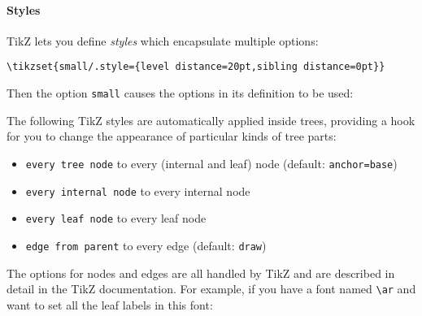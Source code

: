\documentclass{article}
\begin{document}
\paragraph{Styles} TikZ lets you define \emph{styles}\/ which encapsulate multiple options:
\begin{Verbatim}
\tikzset{small/.style={level distance=20pt,sibling distance=0pt}}
\end{Verbatim}
Then the option \verb|small| causes the options in its definition to be used:
\begin{center}
\begin{SideBySideExample}
%
\end{SideBySideExample}
\end{center}
The following TikZ styles are automatically applied inside trees,
providing a hook for you to change the appearance of particular kinds
of tree parts:
\begin{itemize}
\item \verb|every tree node| to every (internal and leaf) node (default: \verb|anchor=base|)
\item \verb|every internal node| to every internal node
\item \verb|every leaf node| to every leaf node
\item \verb|edge from parent| to every edge (default: \verb|draw|)
\end{itemize}

The options for nodes and edges are all handled by TikZ and are
described in detail in the TikZ documentation. For example, if you
have a font named \verb|\ar| and want to set all the leaf labels in
this font:
\begin{center}
\begin{SideBySideExample}
\end{SideBySideExample}
\end{center}
\end{document}
